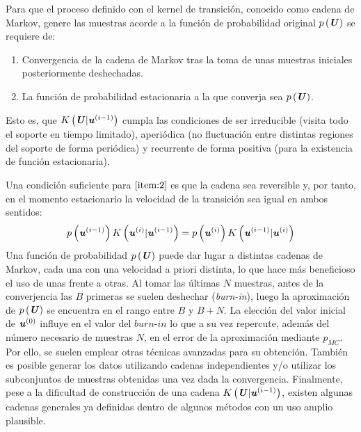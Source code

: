 Para que el proceso definido con el kernel de transición, conocido como cadena de Markov, genere las muestras acorde a la función de probabilidad original $p\left(\textbf{\textit{U}}\right)$ se requiere de:

\begin{enumerate}
    \item Convergencia de la cadena de Markov tras la toma de unas muestras iniciales posteriormente deshechadas.
    \item La función de probabilidad estacionaria a la que converja sea $p\left(\textbf{\textit{U}}\right)$. \label{item:2}
\end{enumerate}

Esto es, que $K\left(\textbf{\textit{U}}|\textbf{\textit{u}}^{(i-1)}\right)$ cumpla las condiciones de ser irreducible (visita todo el soporte en tiempo limitado), aperiódica (no fluctuación entre distintas regiones del soporte de forma periódica) y recurrente de forma positiva (para la existencia de función estacionaria).

Una condición suficiente para $\ref{item:2}$ es que la cadena sea reversible y, por tanto, en el momento estacionario la velocidad de la transición sea igual en ambos sentidos:
\begin{equation}
    p\left(\textbf{\textit{u}}^{(i-1)}\right)K\left(\textbf{\textit{u}}^{(i)}|\textbf{\textit{u}}^{(i-1)}\right) = p\left(\textbf{\textit{u}}^{(i)}\right)K\left(\textbf{\textit{u}}^{(i-1)}|\textbf{\textit{u}}^{(i)}\right)
    \label{ec:3.7}
\end{equation}
Una función de probabilidad $p\left(\textbf{\textit{U}}\right)$ puede dar lugar a distintas cadenas de Markov, cada una con una velocidad a priori distinta, lo que hace más beneficioso el uso de unas frente a otras. Al tomar las últimas $N$ muestras, antes de la converjencia las $B$ primeras se suelen deshechar (\textit{burn-in}), luego la aproximación de $p\left(\textbf{\textit{U}}\right)$ se encuentra en el rango entre $B$ y $B+N$. La elección del valor inicial de $\textbf{\textit{u}}^{(0)}$ influye en el valor del $\textit{burn-in}$ lo que a su vez repercute, además del número necesario de muestras $N$, en el error de la aproximación mediante $p_{MC}$. Por ello, se suelen emplear otras técnicas avanzadas para su obtención. También es posible generar los datos utilizando cadenas independientes y/o utilizar los subconjuntos de muestras obtenidas una vez dada la convergencia. Finalmente, pese a la dificultad de construcción de una cadena $K\left(\textbf{\textit{U}}|\textbf{\textit{u}}^{(i-1)}\right)$, existen algunas cadenas generales ya definidas dentro de algunos métodos con un uso amplio plausible.

